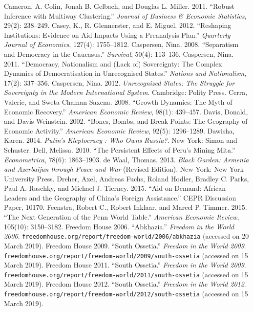\documentclass[12pt,a4paper]{article}%
\begin{document}
\begin{thebibliography}{99}
\bibitem{} Cameron, A. Colin, Jonah B. Gelbach, and Douglas L. Miller. 2011. ``Robust Inference with Multiway Clustering.'' \textit{Journal of Business \& Economic Statistics}, 29(2): 238--249.
\bibitem{} Casey, K., R. Glennerster, and E. Miguel. 2012. ``Reshaping Institutions: Evidence on Aid Impacts Using a Preanalysis Plan.'' \textit{Quarterly Journal of Economics}, 127(4): 1755--1812.
\bibitem{} Caspersen, Nina. 2008. ``Separatism and Democracy in the Caucasus.'' \textit{Survival}, 50(4): 113--136.
\bibitem{} Caspersen, Nina. 2011. ``Democracy, Nationalism and (Lack of) Sovereignty: The Complex Dynamics of Democratisation in Unrecognised States.'' \textit{Nations and Nationalism}, 17(2): 337--356.
\bibitem{} Caspersen, Nina. 2012. \textit{Unrecognized States: The Struggle for Sovereignty in the Modern International System}. Cambridge: Polity Press.
\bibitem{} Cerra, Valerie, and Sweta Chaman Saxena. 2008. ``Growth Dynamics: The Myth of Economic Recovery.'' \textit{American Economic Review}, 98(1): 439--457.
\bibitem{} Davis, Donald, and Davis Weinstein. 2002. ``Bones, Bombs, and Break Points: The Geography of Economic Activity.'' \textit{American Economic Review}, 92(5): 1296--1289.
\bibitem{} Dawisha, Karen. 2014. \textit{Putin's Kleptocracy : Who Owns Russia?}. New York: Simon and Schuster.
\bibitem{} Dell, Melissa. 2010. ``The Persistent Effects of Peru's Mining Mita.'' \textit{Econometrica}, 78(6): 1863--1903.
\bibitem{} de Waal, Thomas. 2013. \textit{Black Garden: Armenia and Azerbaijan through Peace and War} (Revised Edition). New York: New York University Press.
\bibitem{} Dreher, Axel, Andreas Fuchs, Roland Hodler, Bradley C. Parks, Paul A. Raschky, and Michael J. Tierney. 2015. ``Aid on Demand: African Leaders and the Geography of China's Foreign Assistance.'' CEPR Discussion Paper, 10170.
\bibitem{} Feenstra, Robert C., Robert Inklaar, and Marcel P. Timmer. 2015. ``The Next Generation of the Penn World Table.'' \textit{American Economic Review}, 105(10): 3150--3182.
\bibitem{} Freedom House 2006. ``Abkhazia.'' \textit{Freedom in the World 2006}. \verb!freedomhouse.org/report/freedom-world/2006/abkhazia! (accessed on 20 March 2019).
\bibitem{} Freedom House 2009. ``South Ossetia.'' \textit{Freedom in the World 2009}. \verb!freedomhouse.org/report/freedom-world/2009/south-ossetia! (accessed on 15 March 2019).
\bibitem{} Freedom House 2011. ``South Ossetia.'' \textit{Freedom in the World 2009}. \verb!freedomhouse.org/report/freedom-world/2011/south-ossetia! (accessed on 15 March 2019).
\bibitem{} Freedom House 2012. ``South Ossetia.'' \textit{Freedom in the World 2012}. \verb!freedomhouse.org/report/freedom-world/2012/south-ossetia! (accessed on 15 March 2019).

\end{thebibliography}
\end{document}
